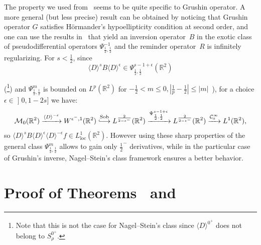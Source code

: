 \documentclass[AHL,Unicode,longabstracts,published]{cedram}
\DeclareMathOperator{\Sob}{Sob}
\DeclareMathOperator{\locc}{loc}
\newcommand{\bbR}{\mathbb{R}}
\newcommand{\clC}{\mathcal{C}}
\newcommand{\clM}{\mathcal{M}}
\newcommand{\longhookrightarrow}{\lhook\joinrel\longrightarrow}
\newcommand*{\hookto}{\mathchoice{\longhookrightarrow}{\hookrightarrow}{\hookrightarrow}{\hookrightarrow}}
\newcommand*{\MK}{\mkern 2mu}
\begin{document}
\begin{rema}
The property we used from~\cite{NS} seems to be quite specific to Grushin operator. A more general (but less precise) result can be obtained by noticing that Grushin operator $G$ satisfies H\"ormander's hypoellipticity condition at second order, and one can use the results in~\cite{CCX} that yield an inversion operator~$B$ in the exotic class of pseudodifferential operators $\Psi^{-1}_{\frac 12,\frac 12}$ and the reminder operator~$R$ is infinitely regularizing.
For $s<\frac 12$, since
\[
\langle D\rangle^{s}B\langle D\rangle^\epsilon \in \Psi^{s-1+\epsilon}_{\frac 12,\frac 12}(\bbR^2)
\]

\noindent (\cite[Theorem~8.4$\MK$(3) combined with the remark at the end of ibid. in \S~VIII]{Ho}\footnote{Note that this is not the case for Nagel--Stein's class since $\langle D\rangle ^{0^+}$ does not belong to $S^{0^+}_\rho$.})
and $\Psi^m_{\frac 12,\frac 12}$ is bounded on $L^p(\bbR^2)$ for $-\frac 12<m\leq 0, |\frac 1p-\frac 12|\leq |m|$~\cite[\S~VIII, 5.12$\MK$(e), (g)]{Stein}), for a choice $\epsilon\in\mathopen{]}0,1-2s]$ we have:
\[
\clM_0(\bbR^2) \xrightarrow{\langle D\rangle^{-\epsilon} } W^{\epsilon^-,1} (\bbR^2)\overset{\Sob}{\hookto}L^{\frac{2}{2-\epsilon^-}}(\bbR^2)\xrightarrow{\Psi^{s-1+\epsilon}_{\frac 12,\frac 12}}L^{\frac{2}{2-\epsilon^-}}(\bbR^2) \xrightarrow{\clC^\infty_0} L^1(\bbR^2),
\]
so $ \langle D\rangle^{s} B\langle D\rangle^\epsilon \langle D\rangle ^{-\epsilon} f\in L^1_{\locc}(\bbR^2)$. However using these sharp properties of the general class $\Psi^m_{\frac 12,\frac 12}$ allows to gain only $\frac{1}{2}^-$ derivatives, while in the particular case of Grushin's inverse, Nagel--Stein's class framework ensures a better behavior.
\end{rema}



\section{Proof of Theorems~\protect{\ref{thvectcinfty}} and \protect{\ref{thvectL1}}}\label{secthyposyst}
\end{document}
